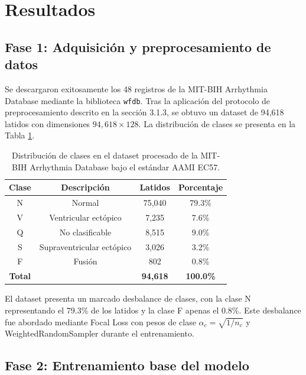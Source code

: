 \section{Resultados}

\subsection{Fase 1: Adquisición y preprocesamiento de datos}

Se descargaron exitosamente los 48 registros de la MIT-BIH Arrhythmia Database mediante la biblioteca \texttt{wfdb}. Tras la aplicación del protocolo de preprocesamiento descrito en la sección 3.1.3, se obtuvo un dataset de 94,618 latidos con dimensiones $94{,}618 \times 128$. La distribución de clases se presenta en la Tabla \ref{T_distribucion}.

\begin{table}[h]
\caption{Distribución de clases en el dataset procesado de la MIT-BIH Arrhythmia Database bajo el estándar AAMI EC57.}
\label{T_distribucion}
\begin{center}
\begin{tabular}{cccc}
\hline
\textbf{Clase} & \textbf{Descripción} & \textbf{Latidos} & \textbf{Porcentaje} \\ \hline
N & Normal                   & 75,040 & 79.3\% \\
V & Ventricular ectópico     &  7,235 &  7.6\% \\
Q & No clasificable          &  8,515 &  9.0\% \\
S & Supraventricular ectópico &  3,026 &  3.2\% \\
F & Fusión                   &    802 &  0.8\% \\
\hline
\textbf{Total} & & \textbf{94,618} & \textbf{100.0\%} \\
\hline
\end{tabular}
\end{center}
\end{table}

El dataset presenta un marcado desbalance de clases, con la clase N representando el 79.3\% de los latidos y la clase F apenas el 0.8\%. Este desbalance fue abordado mediante Focal Loss con pesos de clase $\alpha_c = \sqrt{1/n_c}$ y WeightedRandomSampler durante el entrenamiento.

\subsection{Fase 2: Entrenamiento base del modelo}

